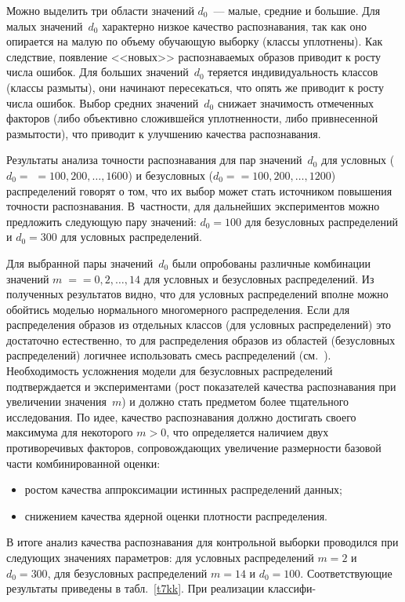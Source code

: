 \begin{multicols}{2}
      Можно выделить три области значений $d_0$~--- малые, средние и большие. Для малых 
значений~$d_0$ характерно низкое качество распознавания, так как 
 оно опирается на малую по 
объему обучающую выборку (классы уплотнены). Как следствие, появление <<новых>> 
распознаваемых образов приводит к росту числа ошибок. Для больших значений~$d_0$ теряется 
индивидуальность классов (классы размыты), они начинают пересекаться, что опять же приводит 
к росту числа ошибок. Выбор средних значений~$d_0$ снижает значимость отмеченных факторов 
(либо объективно сложившейся уплотненности, либо привнесенной размытости), что приводит к 
улучшению качества распознавания.
      
      Результаты анализа точности распознавания для пар значений~$d_0$ для условных ($d_0 =$\linebreak 
$=100, 200, \ldots , 1600$) и безусловных ($d_0 =$\linebreak $= 100, 200, \ldots , 1200$) распределений говорят о 
том, что их выбор может стать источником повышения точности распознавания. В~частности, для 
дальнейших экспериментов можно предложить следующую пару значений: $d_0=100$ для 
безусловных распределений и  $d_0=300$ для условных распределений.
      
      Для выбранной пары значений~$d_0$ были опробованы различные комбинации значений 
$m\;=$\linebreak $=0, 2, \ldots , 14$ для условных и безусловных распределений. Из полученных результатов 
видно, что для условных распределений вполне можно обойтись моделью нормального 
многомерного распределения. Если для распределения образов из отдельных классов (для 
условных распределений) это достаточно естественно, то для распределения образов из областей 
(безусловных распределений) логичнее использовать смесь распределений (см.~\cite{1kk}). 
Необходимость усложнения модели для безусловных распределений подтверждается и 
экспериментами (рост показателей качества распознавания при увеличении значения~$m$) и 
должно стать предметом более тщательного исследования. По идее, качество распознавания 
должно достигать своего максимума для некоторого $m>0$, что определяется наличием двух 
противоречивых факторов, сопровождающих увеличение размерности базовой части 
комбинированной оценки:
      \begin{itemize}
      \item ростом качества аппроксимации истинных распределений данных;
\item снижением качества ядерной оценки плотности распределения.
\end{itemize}

      В итоге анализ качества распознавания для контрольной выборки проводился при 
следующих значениях параметров: для условных распределений $m=2$ и $d_0=300$, для 
безусловных распределений $m=14$ и $d_0=100$. Соответствующие результаты приведены в 
табл.~\ref{t7kk}. При реализации классифи-\linebreak\vspace*{-12pt}
\pagebreak

\end{multicols}
